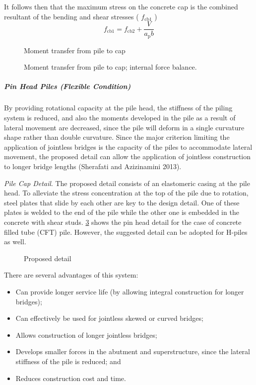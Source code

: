 It follows then that the maximum stress on the concrete cap is the combined resultant of the bending and shear stresses ( $f_\text{cb1}$ )
\begin{equation}
  f_\text{cb1} =f_\text{cb2} +\frac{V}{a_\text{p}b}
\end{equation}

\begin{figure}
  \caption{Moment transfer from pile to cap}
  \label{fig:moment-transfer-pile-cap}
\end{figure}

\begin{figure}
  \caption{Moment transfer from pile to cap; internal force balance.}
  \label{fig:moment-transfer-pile-cap-internal-balance}
\end{figure}


\subparagraph{Pin Head Piles (Flexible Condition)}
By providing rotational capacity at the pile head, the stiffness of the piling system is reduced, and also the
moments developed in the pile as a result of lateral movement are decreased, since the pile will deform in a single
curvature shape rather than double curvature. Since the major criterion limiting the application of jointless bridges is
the capacity of the piles to accommodate lateral movement, the proposed detail can allow the application of jointless
construction to longer bridge lengths (Sherafati and Azizinamini 2013).

\emph{Pile Cap Detail}. The proposed detail consists of an elastomeric casing at the pile head. To alleviate the stress
concentration at the top of the pile due to rotation, steel plates that slide by each other are key to the design detail. One
of these plates is welded to the end of the pile while the other one is embedded in the concrete with shear studs.
\cref{fig:proposed-detail} shows the pin head detail for the case of concrete filled tube (CFT) pile. However, the suggested detail
can be adopted for H-piles as well.

\begin{figure}
  \caption{Proposed detail}
  \label{fig:proposed-detail}
\end{figure}

There are several advantages of this system:
\begin{itemize}
  \item Can provide longer service life (by allowing integral construction for longer bridges);
  \item Can effectively be used for jointless skewed or curved bridges;
  \item Allows construction of longer jointless bridges;
  \item Develops smaller forces in the abutment and superstructure, since the lateral stiffness of the pile is reduced; and
  \item Reduces construction cost and time.
\end{itemize}

